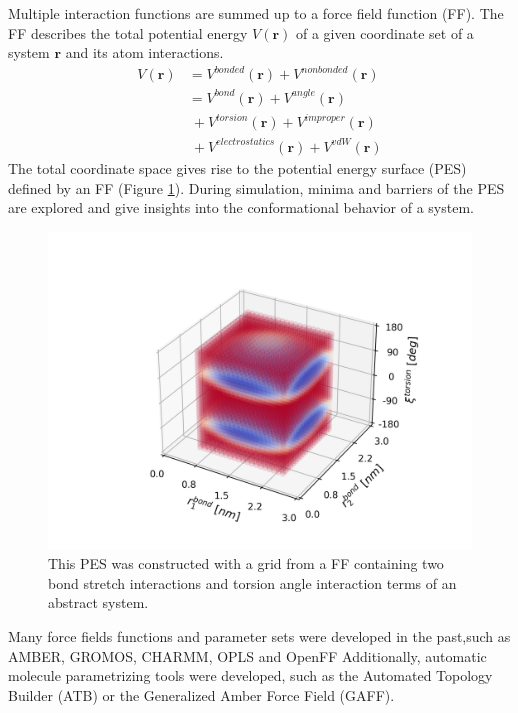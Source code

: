 Multiple interaction functions are summed up to a force field function (FF). The FF describes the total potential energy $V(\textbf{r})$ of a given coordinate set of a system $\textbf{r}$ and its atom interactions. 
\begin{equation}
\begin{split}
    V(\textbf{r}) &= V^{bonded}(\textbf{r}) + V^{nonbonded}(\textbf{r})\\
          &= V^{bond}(\textbf{r}) + V^{angle}(\textbf{r}) \\
          &~ + V^{torsion}(\textbf{r}) + V^{improper}(\textbf{r}) \\
          &~ + V^{electrostatics}(\textbf{r}) + V^{vdW}(\textbf{r})
\end{split}
\end{equation}
The total coordinate space gives rise to the potential energy surface (PES) defined by an FF (Figure \ref{fig:ffPES}).
During simulation, minima and barriers of the PES are explored and give insights into the conformational behavior of a system.

\begin{figure}
    \centering
    \includegraphics[width=\textwidth]{2_chapter_intro/fig/ForceField/bondterms.png}
    \caption{This PES was constructed with a grid from a FF containing two bond stretch interactions and torsion angle interaction terms of an abstract system.}
    \label{fig:ffPES}
\end{figure}

Many force fields functions and parameter sets were developed in the past,such as AMBER\cite{Weiner1981, Pearlman1995, Cornell1995, Lindorfflarsen2010}, GROMOS\cite{Daura1998, Oostenbrink2004, Schuler2001, Schmid2011,Malde2011, Stroet2018}, CHARMM\cite{Brooks1983, Mackerell1995, Mackerell1998}, OPLS \cite{Jorgensen1988, Jorgensen1996} and OpenFF \cite{Qiu2021}
Additionally, automatic molecule parametrizing tools were developed, such as the Automated Topology Builder (ATB) \cite{Malde2011, Stroet2018} or the Generalized Amber Force Field (GAFF)\cite{Sprenger2015}.

